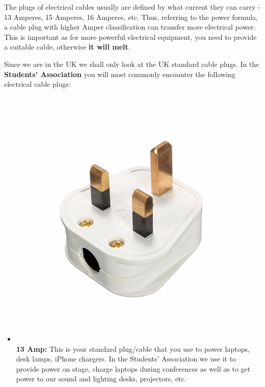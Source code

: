 \documentclass[14pt,twocolumn]{extarticle} %
\begin{document}
The plugs of electrical cables usually are defined by what current they can carry - 13 Amperes, 15 Amperes, 16 Amperes, etc. Thus, referring to the power formula, a cable plug with higher Amper classification can transfer more electrical power. This is important as for more powerful electrical equipment, you need to provide a suitable cable, otherwise \textbf{it will melt}.

Since we are in the UK we shall only look at the UK standard cable plugs. In the \textbf{Students' Association} you will most commonly encounter the following electrical cable plugs:

\begin{itemize}

\item \includegraphics[scale=0.19]{13amp.jpg}\textbf{13 Amp:} This is your standard plug/cable that you use to power laptops, desk lamps, iPhone chargers. In the Students' Association we use it to provide power on stage, charge laptops during conferences as well as to get power to our sound and lighting desks, projectors, etc.  


\end{itemize}
\end{document}
